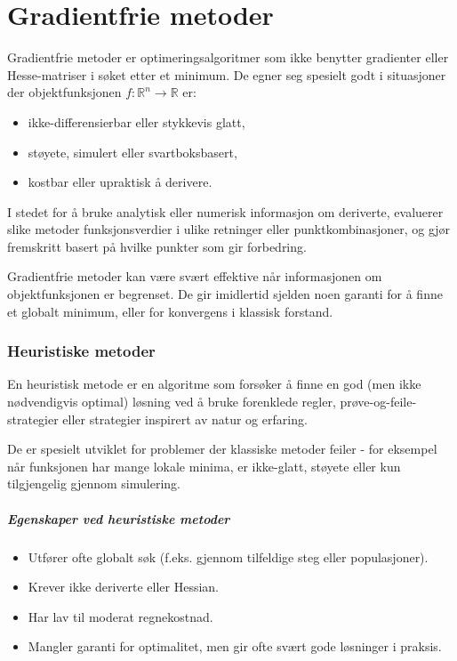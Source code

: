 \chapter{Gradientfrie metoder}
\label{sec:gradientfrie_metoder}

Gradientfrie metoder er optimeringsalgoritmer som ikke benytter gradienter eller Hesse-matriser i søket etter et minimum.
De egner seg spesielt godt i situasjoner der objektfunksjonen \( f : \mathbb{R}^n \to \mathbb{R} \) er:
\begin{itemize}
	\item ikke-differensierbar eller stykkevis glatt,
	\item støyete, simulert eller svartboksbasert,
	\item kostbar eller upraktisk å derivere.
\end{itemize}

I stedet for å bruke analytisk eller numerisk informasjon om deriverte, evaluerer slike metoder funksjonsverdier i ulike retninger eller punktkombinasjoner, og gjør fremskritt basert på hvilke punkter som gir forbedring.

Gradientfrie metoder kan være svært effektive når informasjonen om objektfunksjonen er begrenset. De gir imidlertid sjelden noen garanti for å finne et globalt minimum, eller for konvergens i klassisk forstand.

\subsection{Heuristiske metoder}

En heuristisk metode er en algoritme som forsøker å finne en god (men ikke nødvendigvis optimal) løsning ved å bruke forenklede regler, prøve-og-feile-strategier eller strategier inspirert av natur og erfaring.

De er spesielt utviklet for problemer der klassiske metoder feiler - for eksempel når funksjonen har mange lokale minima, er ikke-glatt, støyete eller kun tilgjengelig gjennom simulering.

\paragraph{Egenskaper ved heuristiske metoder}

\begin{itemize}
	\item Utfører ofte globalt søk (f.eks. gjennom tilfeldige steg eller populasjoner).
	\item Krever ikke deriverte eller Hessian.
	\item Har lav til moderat regnekostnad.
	\item Mangler garanti for optimalitet, men gir ofte svært gode løsninger i praksis.
\end{itemize}

